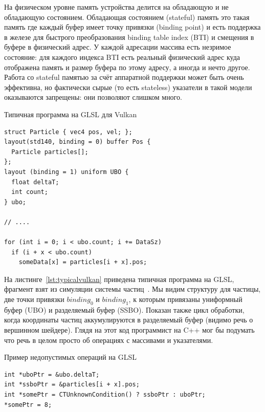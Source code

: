На физическом уровне память устройства делится на обладающую и не обладающую состоянием. Обладающая состоянием (stateful) память это такая память где каждый буфер имеет точку привязки (binding point) и есть поддержка в железе для быстрого преобразования binding table index (BTI) и смещения в буфере в физический адрес. У каждой адресации массива есть незримое состояние: для каждого индекса BTI есть реальный физический адрес куда отображена память и размер буфера по этому адресу, а иногда и нечто другое. Работа со stateful памятью за счёт аппаратной поддержки может быть очень эффективна, но фактически сырые (то есть stateless) указатели в такой модели оказываются запрещены: они позволяют слишком много.

\begin{ListingEnv}[!h]
    \captiondelim{ } 
    \caption{Типичная программа на GLSL для Vulkan}\label{lst:typicalvulkan}
    \begin{lstlisting}[language={[ISO]C++}]
struct Particle { vec4 pos, vel; };
layout(std140, binding = 0) buffer Pos {
  Particle particles[];
};
layout (binding = 1) uniform UBO {
  float deltaT;
  int count;
} ubo;

// ....

for (int i = 0; i < ubo.count; i += DataSz)
  if (i + x < ubo.count)
    someData[x] = particles[i + x].pos;
    \end{lstlisting}
\end{ListingEnv}

На листинге~\cref{lst:typicalvulkan} приведена типичная программа на GLSL, фрагмент взят из симуляции системы частиц~\cite{gunadi2018real}. Мы видим структуру для частицы, две точки привязки $binding_0$ и $binding_1$, к которым привязаны униформный буфер (UBO) и разделяемый буфер (SSBO). Показан также цикл обработки, когда координаты частиц аккумулируются в разделяемый буфер (видимо речь о вершинном шейдере). Глядя на этот код программист на C++ мог бы подумать что речь в целом просто об операциях с массивами и указателями.


\begin{ListingEnv}[!h]
    \captiondelim{ } 
    \caption{Пример недопустимых операций на GLSL}\label{lst:fakepointers}
    \begin{lstlisting}[language={[ISO]C++}]
int *uboPtr = &ubo.deltaT;
int *ssboPtr = &particles[i + x].pos;
int *somePtr = CTUnknownCondition() ? ssboPtr : uboPtr;
*somePtr = 8;
    \end{lstlisting}
\end{ListingEnv}

